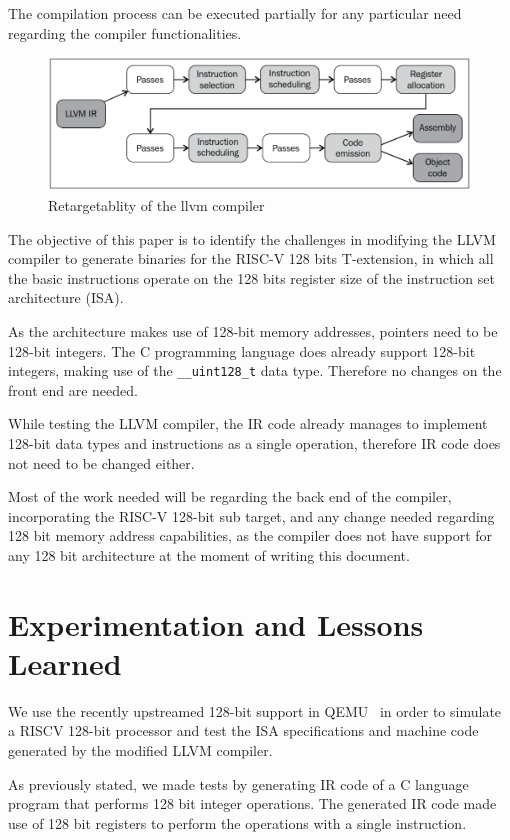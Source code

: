 \documentclass[a4paper,conference]{IEEEtran}
\newcommand{\riscv}{\textsc{\small RISC-V}\xspace}
\begin{document}
The compilation process can be executed partially for any particular need regarding the compiler functionalities. 

\label{sec:di}
\begin{figure}[hbtp]\center\leavevmode
	\includegraphics[width=1\linewidth]{llvmPipeline}
	\caption{Retargetablity of the llvm compiler}
	\label{fig:llvmPipeline}
\end{figure}

The objective of this paper is to identify the challenges in modifying the LLVM compiler to generate  binaries for the \riscv 128 bits T-extension, in which all the basic instructions operate on the 128 bits register size of the instruction set architecture (ISA).

As the architecture makes use of 128-bit memory addresses, pointers need to be 128-bit integers. The C programming language does already support 128-bit integers, making use of the \texttt{__uint128_t} data type. Therefore no changes on the front end are needed.

While testing the LLVM compiler, the IR code already manages to implement 128-bit data types and instructions as a single operation, therefore IR code does not need to be changed either.

Most of the work needed will be regarding the back end of the compiler, incorporating the \riscv 128-bit sub target, and any change needed regarding 128 bit memory address capabilities, as the compiler does not have support for any 128 bit architecture at the moment of writing this document.

\section{Experimentation and Lessons Learned}
\label{sec:ex}
We use the recently upstreamed 128-bit support in QEMU~\cite{portas2022fast} in order to simulate a RISCV 128-bit processor and test the ISA specifications and machine code generated by the modified LLVM compiler.

As previously stated, we made tests by generating IR code of a C language program that performs 128 bit integer operations. The generated IR code made use of 128 bit registers to perform the operations with a single instruction. 
\end{document}
